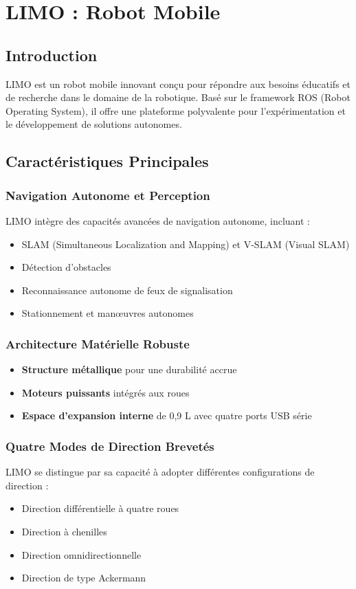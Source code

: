 \chapter{LIMO : Robot Mobile}
\section{Introduction}

LIMO est un robot mobile innovant conçu pour répondre aux besoins éducatifs et de recherche dans le domaine de la robotique. Basé sur le framework ROS (Robot Operating System), il offre une plateforme polyvalente pour l'expérimentation et le développement de solutions autonomes.

\section{Caractéristiques Principales}

\subsection{Navigation Autonome et Perception}
LIMO intègre des capacités avancées de navigation autonome, incluant :
\begin{itemize}
    \item SLAM (Simultaneous Localization and Mapping) et V-SLAM (Visual SLAM)
    \item Détection d'obstacles
    \item Reconnaissance autonome de feux de signalisation
    \item Stationnement et manœuvres autonomes
\end{itemize}

\subsection{Architecture Matérielle Robuste}
\begin{itemize}
    \item \textbf{Structure métallique} pour une durabilité accrue
    \item \textbf{Moteurs puissants} intégrés aux roues
    \item \textbf{Espace d'expansion interne} de 0,9 L avec quatre ports USB série
\end{itemize}

\subsection{Quatre Modes de Direction Brevetés}
LIMO se distingue par sa capacité à adopter différentes configurations de direction :
\begin{itemize}
    \item Direction différentielle à quatre roues
    \item Direction à chenilles
    \item Direction omnidirectionnelle
    \item Direction de type Ackermann
\end{itemize}

